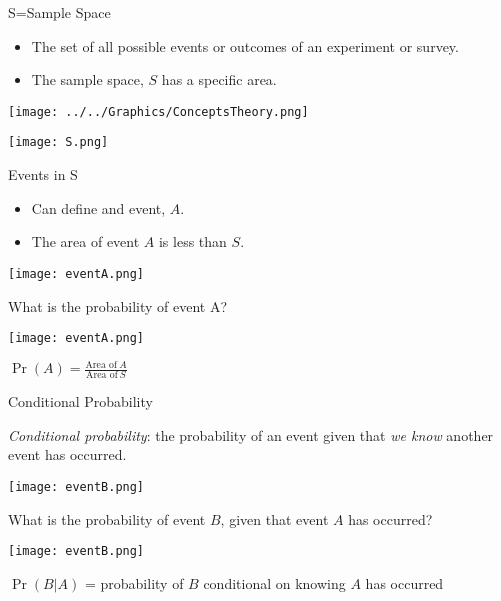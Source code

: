 \documentclass[ignorenonframetext,]{beamer}
\providecommand{\tightlist}{%
  \setlength{\itemsep}{0pt}\setlength{\parskip}{0pt}}
\begin{document}
\begin{frame}{S=Sample Space}

\begin{itemize}
\tightlist
\item
  The set of all possible events or outcomes of an experiment or survey.
\item
  The sample space, \(S\) has a specific area.
\end{itemize}

\center\texttt{[image: ../../Graphics/ConceptsTheory.png]}

\texttt{[image: S.png]}

\end{frame}

\begin{frame}{Events in S}

\begin{itemize}
\tightlist
\item
  Can define and event, \(A\).
\item
  The area of event \(A\) is less than \(S\).
\end{itemize}

\texttt{[image: eventA.png]}

\end{frame}

\begin{frame}{What is the probability of event A?}

\texttt{[image: eventA.png]}

\(\Pr(A) = \frac{\text{Area of}~A}{\text{Area of}~S}\)

\end{frame}

\begin{frame}{Conditional Probability}

\emph{Conditional probability}: the probability of an event given that
\emph{we know} another event has occurred.

\texttt{[image: eventB.png]}

\end{frame}

\begin{frame}{What is the probability of event \(B\), given that event
\(A\) has occurred?}

\texttt{[image: eventB.png]}

\(\Pr(B|A)\) = probability of \(B\) conditional on knowing \(A\) has
occurred

\end{frame}
\end{document}
